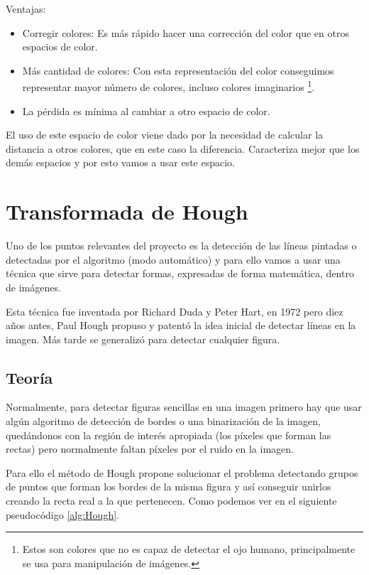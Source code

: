 Ventajas:
\begin{itemize}
\item Corregir colores: Es más rápido hacer una corrección del color que en otros espacios de color.
\item Más cantidad de colores: Con esta representación del color conseguimos representar mayor número de colores, incluso colores imaginarios \footnote{Estos son colores que no es capaz de detectar el ojo humano, principalmente se usa para manipulación de imágenes.}.
\item La pérdida es mínima al cambiar a otro espacio de color.
\end{itemize}

El uso de este espacio de color viene dado por la necesidad de calcular la distancia a otros colores, que en este caso la diferencia. Caracteriza mejor que los demás espacios y por esto vamos a usar este espacio.
\section{Transformada de Hough }

Uno de los puntos relevantes del proyecto es la detección de las líneas pintadas o detectadas por el algoritmo (modo automático) y para ello vamos a usar una técnica que sirve para detectar formas, expresadas de forma matemática, dentro de imágenes.

Esta técnica fue inventada por Richard Duda y Peter Hart, en 1972 pero diez años antes, Paul Hough propuso y patentó \cite{pat:patHough} la idea inicial de detectar líneas en la imagen. Más tarde se generalizó para detectar cualquier figura.

\subsection{Teoría}

Normalmente, para detectar figuras sencillas en una imagen primero hay que usar algún algoritmo de detección de bordes o una binarización de la imagen, quedándonos con la región de interés apropiada (los píxeles que forman las rectas) pero normalmente faltan píxeles por el ruido en la imagen.

Para ello el método de Hough propone solucionar el problema detectando grupos de puntos que forman los bordes de la misma figura y así conseguir unirlos creando la recta real a la que pertenecen. Como podemos ver en el siguiente pseudocódigo 
\ref{alg:Hough}.

